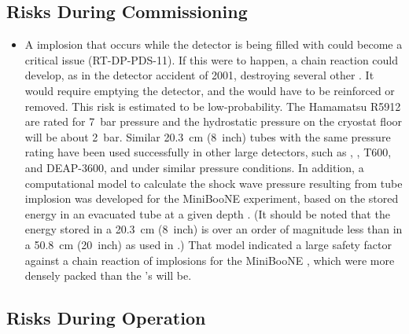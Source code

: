 \subsection{Risks During Commissioning}
\label{sec:dp-pds-risks_commissioning}

\begin{itemize}

\item %
A  implosion that occurs while the detector is being filled  with  could become a critical issue (RT-DP-PDS-11). If this were to happen, a chain reaction could develop, as in the  detector accident of 2001, destroying several other . It would require emptying the detector, and the  would have to be reinforced or removed. This risk is estimated to be low-probability. 
The Hamamatsu R5912  are rated for \SI{7}{bar} pressure and the hydrostatic pressure on the cryostat floor will be about \SI{2}{bar}. Similar \SI{20.3}{cm} (\SI{8}{inch}) tubes  with the same pressure rating  have been used successfully in other large detectors, such as , ,  T600, and DEAP-3600, and under similar pressure conditions. In addition, a computational model to calculate the shock wave pressure resulting from tube implosion was developed for the MiniBooNE experiment, based on the stored energy in an evacuated tube at a given depth \cite{Brice:2006ny}. (It should be noted that the energy stored in a \SI{20.3}{cm} (\SI{8}{inch})   is over an order of magnitude less than in a \SI{50.8}{cm} (\SI{20}{inch})  as used in .) That %
model indicated a large safety factor against a chain reaction of  implosions for the MiniBooNE , which were more densely packed than the 's will be.

\end{itemize}


\subsection{Risks During Operation}
\label{sec:dp-pds-risks_operation}

